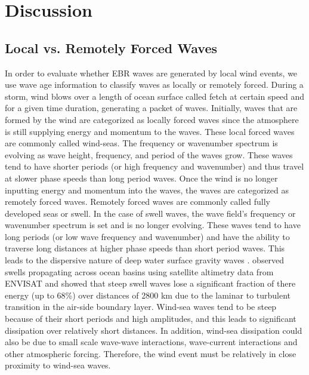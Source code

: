 \documentclass[draft,linenumbers]{agujournal2018}
\begin{document}


\section{Discussion}

\subsection{Local vs. Remotely Forced Waves}

In order to evaluate whether EBR waves are generated by local wind events, we use wave age information to classify waves as locally or remotely forced. During a storm, wind blows over a length of ocean surface called fetch at certain speed and for a given time duration, generating a packet of waves. Initially, waves that are formed by the wind are categorized as locally forced waves since the atmosphere is still supplying energy and momentum to the waves. These local forced waves are commonly called wind-seas. The frequency or wavenumber spectrum is evolving as wave height, frequency, and period of the waves grow. These waves tend to have shorter periods (or high frequency and wavenumber) and thus travel at slower phase speeds than long period waves. Once the wind is no longer inputting energy and momentum into the waves, the waves are categorized as remotely forced waves. Remotely forced waves are commonly called fully developed seas or swell. In the case of swell waves, the wave field's frequency or wavenumber spectrum is set and is no longer evolving. These waves tend to have long periods (or low wave frequency and wavenumber) and have the ability to traverse long distances at higher phase speeds than short period waves. This leads to the dispersive nature of deep water surface gravity waves \cite{snodgrass1966propagation}. \citet{ardhuin2009observation} observed swells propagating across ocean basins using satellite altimetry data from ENVISAT and showed that steep swell waves lose a significant fraction of there energy (up to 68\%) over distances of 2800 km due to the laminar to turbulent transition in the air-side boundary layer. Wind-sea waves tend to be steep because of their short periods and high amplitudes, and this leads to significant dissipation over relatively short distances. In addition, wind-sea dissipation could also be due to small scale wave-wave interactions, wave-current interactions and other atmospheric forcing. Therefore, the wind event must be relatively in close proximity to wind-sea waves.  
\end{document}
